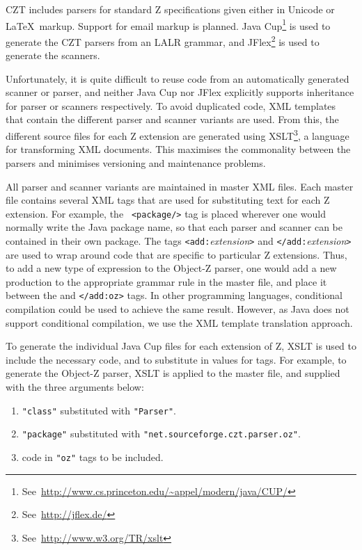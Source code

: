 \documentclass{llncs}
\begin{document}
  CZT includes parsers for standard Z specifications given either in
  Unicode or \LaTeX\ markup.  Support for email markup is planned.  Java
  Cup\footnote{See~\url{http://www.cs.princeton.edu/~appel/modern/java/CUP/}}
  is used to generate the CZT parsers from an LALR grammar, and
  JFlex\footnote{See~\url{http://jflex.de/}} is used to generate the
  scanners.

  Unfortunately, it is quite difficult to reuse code from an
  automatically generated scanner or parser, and neither Java Cup nor
  JFlex explicitly supports inheritance for parser or scanners
  respectively.  To avoid duplicated code, XML templates that contain
  the different parser and scanner variants are used. From this, the
  different source files for each Z extension are generated using
  XSLT\footnote{See~\url{http://www.w3.org/TR/xslt}}, a language for
  transforming XML documents.  This maximises the commonality between
  the parsers and minimises versioning and maintenance problems.

  All parser and scanner variants are maintained in master XML files.
  Each master file contains several XML tags that are used for
  substituting text for each Z extension. For example, the {\tt
  <package/>} tag is placed wherever one would normally write the Java
  package name, so that each parser and scanner can be contained in
  their own package. The tags {\tt <add:}{\em extension}{\tt >} and
  {\tt </add:}{\em extension}{\tt >} are used to wrap around code that
  are specific to particular Z extensions. Thus, to add a new type of
  expression to the Object-Z parser, one would add a new production to
  the appropriate grammar rule in the master file, and place it
  between the {\tt <add:oz>} and {\tt </add:oz>} tags. In other
  programming languages, conditional compilation could be used to
  achieve the same result. However, as Java does not support
  conditional compilation, we use the XML template translation
  approach.

To generate the individual Java Cup files for each extension of Z,
XSLT is used to include the necessary code, and to substitute in
values for tags. For example, to generate the Object-Z parser, XSLT is
applied to the master file, and supplied with the three arguments
below:
\begin{enumerate}
  \item {\tt "class"} substituted with {\tt "Parser"}.
  \item {\tt "package"} substituted with {\tt "net.sourceforge.czt.parser.oz"}.
  \item code in {\tt "oz"} tags to be included.
\end{enumerate}
\end{document}
